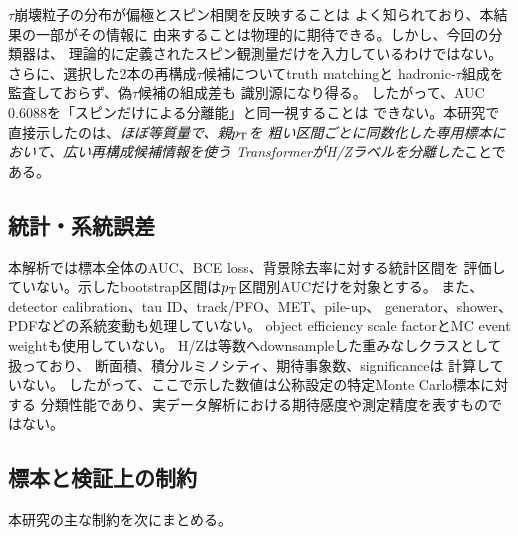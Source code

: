\documentclass[xelatex,ja=standard,a4paper,10pt,twocolumn]{bxjsarticle}
\begin{document}
\(\tau\)崩壊粒子の分布が偏極とスピン相関を反映することは
よく知られており\cite{TauSpinner,TauSpinML}、本結果の一部がその情報に
由来することは物理的に期待できる。しかし、今回の分類器は、
理論的に定義されたスピン観測量だけを入力しているわけではない。
さらに、選択した2本の再構成\(\tau\)候補についてtruth matchingと
hadronic-\(\tau\)組成を監査しておらず、偽\(\tau\)候補の組成差も
識別源になり得る。
したがって、AUC 0.6088を「スピンだけによる分離能」と同一視することは
できない。本研究で直接示したのは、\emph{ほぼ等質量で、親\(p_{\mathrm{T}}\)を
粗い区間ごとに同数化した専用標本において、広い再構成候補情報を使う
TransformerがH/Zラベルを分離した}ことである。

\subsection{統計・系統誤差}

本解析では標本全体のAUC、BCE loss、背景除去率に対する統計区間を
評価していない。示したbootstrap区間は\(p_{\mathrm{T}}\)区間別AUCだけを対象とする。
また、detector calibration、tau ID、track/PFO、MET、pile-up、
generator、shower、PDFなどの系統変動も処理していない。
object efficiency scale factorとMC event weightも使用していない。
H/Zは等数へdownsampleした重みなしクラスとして扱っており、
断面積、積分ルミノシティ、期待事象数、significanceは
計算していない。
したがって、ここで示した数値は公称設定の特定Monte Carlo標本に対する
分類性能であり、実データ解析における期待感度や測定精度を表すものではない。

\subsection{標本と検証上の制約}

本研究の主な制約を次にまとめる。
\end{document}
